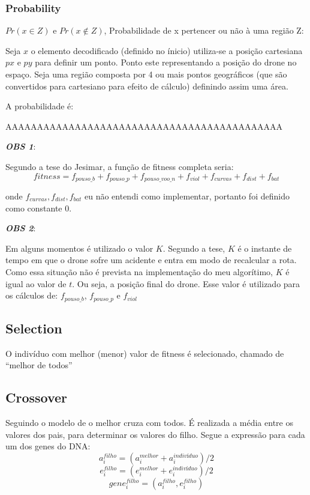 \documentclass{article}
\begin{document}
\subsubsection{Probability}

	\(Pr(x \in Z) \) e \(Pr(x \notin Z) \), Probabilidade de x pertencer ou não à uma região Z:
	
Seja \(x\) o elemento decodificado (definido no ínicio) utiliza-se a posição cartesiana \(px\) e \(py\) para definir um ponto. Ponto este representando a posição do drone no espaço. Seja uma região composta por 4 ou mais pontos geográficos (que são convertidos para cartesiano para efeito de cálculo) definindo assim uma área.

A probabilidade é:

AAAAAAAAAAAAAAAAAAAAAAAAAAAAAAAAAAAAAAAAAAAA

\vspace{5mm} %
\textit{\textbf{OBS 1}}: 

Segundo a tese do Jesimar, a função de fitness completa seria:
\[fitness = f_{pouso\_b} + f_{pouso\_p} + f_{pouso\_voo\_n} + f_{viol} + f_{curvas} + f_{dist} + f_{bat}\]

onde \(f_{curvas}, f_{dist}, f_{bat}\) eu não entendi como implementar, portanto foi definido como constante \(0\).


\vspace{5mm} %

\textit{\textbf{OBS 2}}:

Em alguns momentos é utilizado o valor \(K\). Segundo a tese, \(K\) é o instante de tempo em que o drone sofre um acidente e entra em modo de recalcular a rota.
Como essa situação não é prevista na implementação do meu algorítimo, \(K\)  é igual ao valor de \(t\). Ou seja, a posição final do drone.
Esse valor é utilizado para os cálculos de:  \(f_{pouso\_b}\), \(f_{pouso\_p}\) e \(f_{viol}\) 



\subsection{Selection}
O indivíduo com melhor (menor) valor de fitness é selecionado, chamado de “melhor de todos”


\subsection{Crossover}
Seguindo o modelo de o melhor cruza com todos. É realizada a média entre os valores dos pais, para determinar os valores do filho.
Segue a expressão para cada um dos genes do DNA:
\[a_i^{filho} = ( a_i^{melhor} + a_i^{indivíduo}) / 2\]
\[e_i^{filho} = ( e_i^{melhor} + e_i^{indivíduo}) / 2\]
\[gene_i^{filho} = ( a_i^{filho}, e_i^{filho})\]
\end{document}
